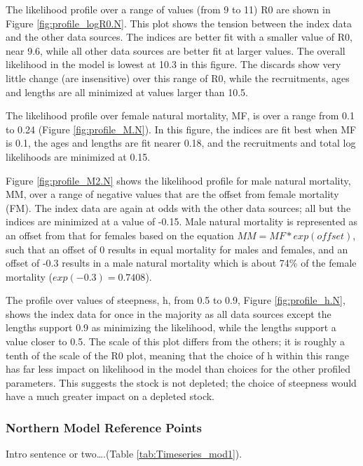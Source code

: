 \documentclass[12pt,]{article}
\begin{document}
The likelihood profile over a range of values (from 9 to 11) R0 are
shown in Figure \ref{fig:profile_logR0.N}. This plot shows the tension
between the index data and the other data sources. The indices are
better fit with a smaller value of R0, near 9.6, while all other data
sources are better fit at larger values. The overall likelihood in the
model is lowest at 10.3 in this figure. The discards show very little
change (are insensitive) over this range of R0, while the recruitments,
ages and lengths are all minimized at values larger than 10.5.

The likelihood profile over female natural mortality, MF, is over a
range from 0.1 to 0.24 (Figure \ref{fig:profile_M.N}). In this figure,
the indices are fit best when MF is 0.1, the ages and lengths are fit
nearer 0.18, and the recruitments and total log likelihoods are
minimized at 0.15.

Figure \ref{fig:profile_M2.N} shows the likelihood profile for male
natural mortality, MM, over a range of negative values that are the
offset from female mortality (FM). The index data are again at odds with
the other data sources; all but the indices are minimized at a value of
-0.15. Male natural mortality is represented as an offset from that for
females based on the equation \(MM = MF*exp(offset)\), such that an
offset of 0 results in equal mortality for males and females, and an
offset of -0.3 results in a male natural mortality which is about 74\%
of the female mortality (\(exp(-0.3) = 0.7408\)).

The profile over values of steepness, h, from 0.5 to 0.9, Figure
\ref{fig:profile_h.N}, shows the index data for once in the majority as
all data sources except the lengths support 0.9 as minimizing the
likelihood, while the lengths support a value closer to 0.5. The scale
of this plot differs from the others; it is roughly a tenth of the scale
of the R0 plot, meaning that the choice of h within this range has far
less impact on likelihood in the model than choices for the other
profiled parameters. This suggests the stock is not depleted; the choice
of steepness would have a much greater impact on a depleted stock.

\subsubsection{Northern Model Reference
Points}\label{northern-model-reference-points}

Intro sentence or two\ldots{}.(Table \ref{tab:Timeseries_mod1}).
\end{document}
